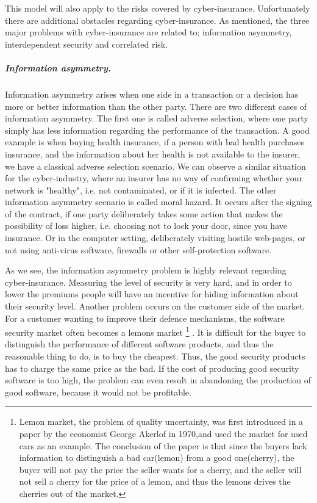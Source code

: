 This model will also apply to the risks covered by cyber-insurance. Unfortunately there are additional obstacles regarding cyber-insurance. As mentioned, the three major problems with cyber-insurance are related to; information asymmetry, interdependent security and correlated risk. 
 
\subparagraph{Information asymmetry.}
Information asymmetry arises when one side in a transaction or a decision has more or better information than the other party. There are two different cases of information asymmetry. The first one is called adverse selection, where one party simply has less information regarding the performance of the transaction. A good example is when buying health insurance, if a person with bad health purchases insurance, and the information about her health is not available to the insurer, we have a classical adverse selection scenario. We can observe a similar situation for the cyber-industry, where an insurer has no way of confirming whether your network is "healthy", i.e. not contaminated, or if it is infected. 
The other information asymmetry scenario is called moral hazard. It occurs after the signing of the contract, if one party deliberately takes some action that makes the possibility of loss higher, i.e. choosing not to lock your door, since you have insurance. Or in the computer setting, deliberately visiting hostile web-pages, or not using anti-virus software, firewalls or other self-protection software.
    \cite{solutiontoinfoasym}
    
As we see, the information asymmetry problem is highly relevant regarding cyber-insurance. Measuring the level of security is very hard, and in order to lower the premiums people will have an incentive for hiding information about their security level. Another problem occurs on the customer side of the market. For a customer wanting to improve their defence mechanisms, the software security market often becomes a lemons market 
\footnote{Lemon market, the problem of quality uncertainty, was first introduced in a paper \cite{lemonpaper} by the economist George Akerlof in 1970,and used the market for used cars as an example.\cite{lemon} The conclusion of the paper is that since the buyers lack information to distinguish a bad car(lemon) from a good one(cherry), the buyer will not pay the price the seller wants for a cherry, and the seller will not sell a cherry for the price of a lemon, and thus the lemons drives the cherries out of the market.}
. 
It is difficult for the buyer to distinguish the performance of different software products, and thus the reasonable thing to do, is to buy the cheapest. Thus, the good security products has to charge the same price as the bad. If the cost of producing good security software is too high, the problem can even result in abandoning the production of good software, because it would not be profitable.

